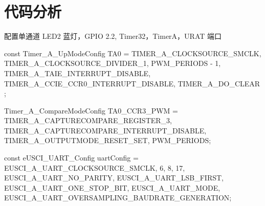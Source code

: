 \documentclass[a4paper,10pt,UTF8]{paper}
\numberwithin{equation}{section}
\numberwithin{figure}{section}
\begin{document}
\section{代码分析}

配置单通道 LED2 蓝灯，GPIO 2.2, Timer32，TimerA，URAT 端口

\begin{ccode}
                    
        
    const Timer_A_UpModeConfig TA0 =
    {
        TIMER_A_CLOCKSOURCE_SMCLK,  
        TIMER_A_CLOCKSOURCE_DIVIDER_1,  
        PWM_PERIODS - 1,  
        TIMER_A_TAIE_INTERRUPT_DISABLE,  
        TIMER_A_CCIE_CCR0_INTERRUPT_DISABLE,
        TIMER_A_DO_CLEAR  
    };
    
    
    Timer_A_CompareModeConfig TA0_CCR3_PWM =
    {
        TIMER_A_CAPTURECOMPARE_REGISTER_3,   
        TIMER_A_CAPTURECOMPARE_INTERRUPT_DISABLE,  
        TIMER_A_OUTPUTMODE_RESET_SET,  
    PWM_PERIODS};
    
    const eUSCI_UART_Config uartConfig =
    {
        EUSCI_A_UART_CLOCKSOURCE_SMCLK,
        6,
        8,
        17,
        EUSCI_A_UART_NO_PARITY,
        EUSCI_A_UART_LSB_FIRST,
        EUSCI_A_UART_ONE_STOP_BIT,
        EUSCI_A_UART_MODE, 
    EUSCI_A_UART_OVERSAMPLING_BAUDRATE_GENERATION};

\end{ccode}
    
\end{document}
